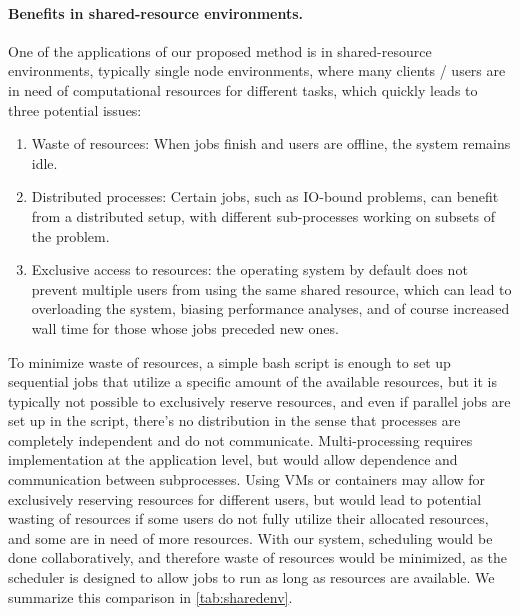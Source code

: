 \documentclass[sigconf]{acmart}
\begin{document}
\paragraph{Benefits in shared-resource environments.}
One of the applications of our proposed method is in shared-resource environments, typically single node environments, where
many clients / users are in need of computational resources for different tasks, which quickly leads to three potential issues:
\begin{enumerate}
    \item Waste of resources: When jobs finish and users are offline, the system remains idle.
    \item Distributed processes: Certain jobs, such as IO-bound problems, can benefit from a distributed setup, with different
        sub-processes working on subsets of the problem.
    \item Exclusive access to resources: the operating system by default does not prevent multiple users from using the same
        shared resource, which can lead to overloading the system, biasing performance analyses, and of course increased wall
        time for those whose jobs preceded new ones.
\end{enumerate}
To minimize waste of resources, a simple bash script is enough to set up sequential jobs that utilize a specific amount of
the available resources, but it is typically not possible to exclusively reserve resources, and even if parallel jobs are
set up in the script, there's no distribution in the sense that processes are completely independent and do not communicate.
Multi-processing requires implementation at the application level, but would allow dependence and communication between
subprocesses. Using VMs or containers may allow for exclusively reserving resources for different users, but would lead to
potential wasting of resources if some users do not fully utilize their allocated resources, and some are in need of more
resources.
With our system, scheduling would be done collaboratively, and therefore waste of resources would be minimized, as the
scheduler is designed to allow jobs to run as long as resources are available.
We summarize this comparison in \cref{tab:sharedenv}.
\end{document}
